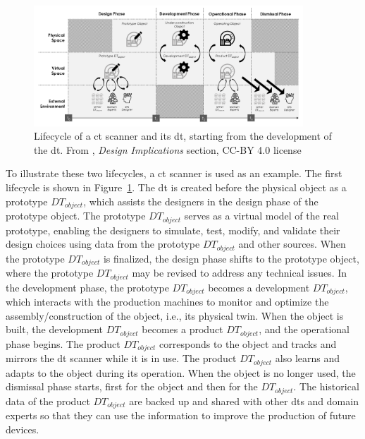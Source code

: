 \begin{figure}
    \centering
    \includegraphics[width=0.9\textwidth]{images/digital_twins/dt_lifecycle_1.png}
    \caption[Lifecycle of a \acrshort{ct} scanner and its \acrshort{dt}, starting from the development of the \acrshort{dt}]{Lifecycle of a \acrshort{ct} scanner and its \acrshort{dt}, starting from the development of the \acrshort{dt}. From \textcite{barricelliSurveyDigitalTwin2019}, \textit{Design Implications} section, CC-BY 4.0 license}
    \label{fig:dt_lifecycle_1}
\end{figure}

To illustrate these two lifecycles, a \acrfull{ct} scanner is used as an example. The first lifecycle is shown in Figure~\ref{fig:dt_lifecycle_1}. The \acrshort{dt} is created before the physical object as a prototype $DT_{object}$, which assists the designers in the design phase of the prototype object. The prototype $DT_{object}$ serves as a virtual model of the real prototype, enabling the designers to simulate, test, modify, and validate their design choices using data from the prototype $DT_{object}$ and other sources. When the prototype $DT_{object}$ is finalized, the design phase shifts to the prototype object, where the prototype $DT_{object}$ may be revised to address any technical issues. In the development phase, the prototype $DT_{object}$ becomes a development $DT_{object}$, which interacts with the production machines to monitor and optimize the assembly/construction of the object, i.e., its physical twin. When the object is built, the development $DT_{object}$ becomes a product $DT_{object}$, and the operational phase begins. The product $DT_{object}$ corresponds to the object and tracks and mirrors the \acrshort{dt} scanner while it is in use. The product $DT_{object}$ also learns and adapts to the object during its operation. When the object is no longer used, the dismissal phase starts, first for the object and then for the $DT_{object}$. The historical data of the product $DT_{object}$ are backed up and shared with other \acrshort{dt}s and domain experts so that they can use the information to improve the production of future devices.

